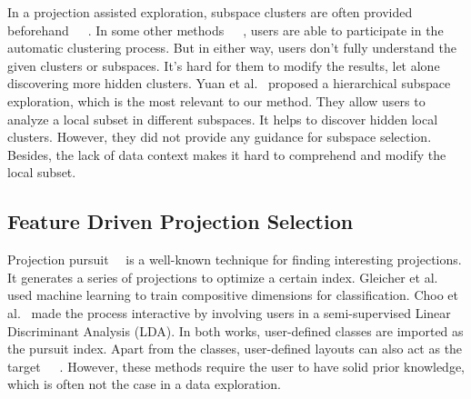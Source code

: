 In a projection assisted exploration, subspace clusters are often provided beforehand~\cite{DBLP:conf/ieeevast/TatuMFBSSK12}~\cite{DBLP:journals/tvcg/NamM13}~\cite{DBLP:journals/cgf/LiuWTBP15}. In some other methods~\cite{DBLP:journals/tois/ChenL06}~\cite{DBLP:conf/ieeevast/NamHMZI07}~\cite{DBLP:conf/ieeevast/TatuMFBSSK12}, users are able to participate in the automatic clustering process. But in either way, users don't fully understand the given clusters or subspaces. It's hard for them to modify the results, let alone discovering more hidden clusters. Yuan et al.~\cite{DBLP:journals/tvcg/YuanRWG13} proposed a hierarchical subspace exploration, which is the most relevant to our method. They allow users to analyze a local subset in different subspaces. It helps to discover hidden local clusters. However, they did not provide any guidance for subspace selection. Besides, the lack of data context makes it hard to comprehend and modify the local subset.

\subsection{Feature Driven Projection Selection}
Projection pursuit~\cite{DBLP:journals/tc/FriedmanT74}~\cite{cook1995grand} is a well-known technique for finding interesting projections. It generates a series of projections to optimize a certain index. Gleicher et al.~\cite{DBLP:journals/tvcg/Gleicher13} used machine learning to train compositive dimensions for classification. Choo et al.~\cite{DBLP:conf/ieeevast/ChooLKP10} made the process interactive by involving users in a semi-supervised Linear Discriminant Analysis (LDA). In both works, user-defined classes are imported as the pursuit index. Apart from the classes, user-defined layouts can also act as the target~\cite{DBLP:journals/tvcg/JoiaCCPN11}~\cite{DBLP:conf/ieeevast/BrownLBC12}~\cite{DBLP:journals/tvcg/HuBMHNL13}. However, these methods require the user to have solid prior knowledge, which is often not the case in a data exploration.

